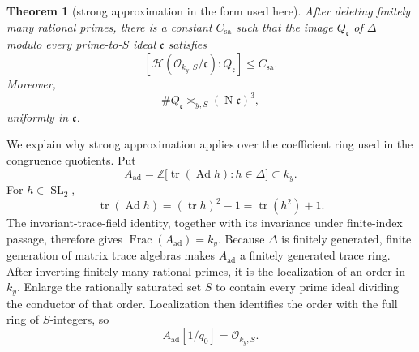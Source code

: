 \documentclass[11pt,reqno]{amsart}
\newtheorem{theorem}{Theorem}[section]
\theoremstyle{definition}
\theoremstyle{remark}
\newcommand{\Z}{\mathbb Z}
\newcommand{\cO}{\mathcal O}
\newcommand{\Tr}{\operatorname{tr}}
\newcommand{\SL}{\operatorname{SL}}
\newcommand{\Norm}{\operatorname{N}}
\begin{document}
\begin{theorem}[strong approximation in the form used here]
\label{input:strong-approximation}
After deleting finitely many rational primes, there is a constant
\(C_{\mathrm{sa}}\) such that the image \(Q_{\mathfrak c}\) of
\(\Delta\) modulo every prime-to-\(S\) ideal \(\mathfrak c\) satisfies
\begin{equation}\label{eq:strong-approximation-index}
 [\mathcal H(\cO_{k_y,S}/\mathfrak c):Q_{\mathfrak c}]
 \le C_{\mathrm{sa}}.
\end{equation}
Moreover,
\begin{equation}\label{eq:quotient-size}
 \#Q_{\mathfrak c}\asymp_{y,S}(\Norm\mathfrak c)^3,
\end{equation}
uniformly in \(\mathfrak c\).
\end{theorem}

We explain why strong approximation applies over the coefficient ring used
in the congruence quotients.  Put
\[
 A_{\mathrm{ad}}
 =\Z\bigl[\Tr(\operatorname{Ad}h):h\in\Delta\bigr]\subset k_y.
\]
For \(h\in\SL_2\),
\[
 \Tr(\operatorname{Ad}h)=(\Tr h)^2-1=\Tr(h^2)+1.
\]
The invariant-trace-field identity, together with its invariance under
finite-index passage, therefore gives
\(\operatorname{Frac}(A_{\mathrm{ad}})=k_y\).  Because \(\Delta\) is
finitely generated, finite generation of matrix trace algebras
\cite{Procesi,Horowitz} makes \(A_{\mathrm{ad}}\) a finitely generated
trace ring.
After inverting finitely many rational primes, it is the localization of an
order in \(k_y\).  Enlarge the rationally saturated set \(S\) to contain
every prime ideal dividing the conductor of that order.  Localization then
identifies the order with the full ring of \(S\)-integers, so
\[
 A_{\mathrm{ad}}[1/q_0]=\cO_{k_y,S}.
\]
\end{document}
